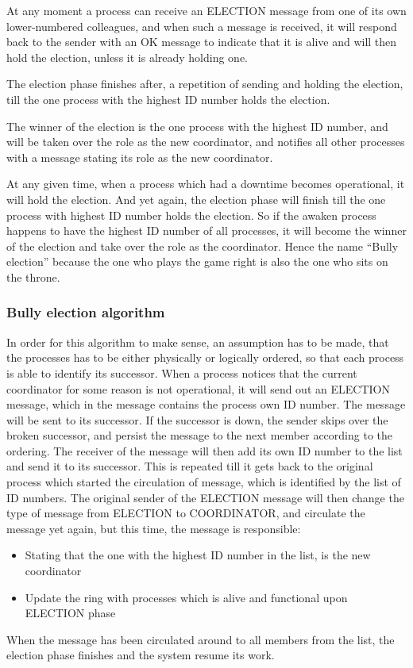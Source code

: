 At any moment a process can receive an ELECTION message from one of its own lower-numbered colleagues, and when such a message is received, it will respond back to the sender with an OK message to indicate that it is alive and will then hold the election, unless it is already holding one.

The election phase finishes after, a repetition of sending and holding the election, till the one process with the highest ID number holds the election.

The winner of the election is the one process with the highest ID number, and will be taken over the role as the new coordinator, and notifies all other processes with a message stating its role as the new coordinator. 

At any given time, when a process which had a downtime becomes operational, it will hold the election.
And yet again, the election phase will finish till the one process with highest ID number holds the election. So if the awaken process happens to have the highest ID number of all processes, it will become the winner of the election and take over the role as the coordinator. Hence the name “Bully election” because the one who plays the game right is also the one who sits on the throne.

\subsubsection{Bully election algorithm}
In order for this algorithm to make sense, an assumption has to be made, that the processes has to be either physically or logically ordered, so that each process is able to identify its successor.
When a process notices that the current coordinator for some reason is not operational, it will send out an ELECTION message, which in the message contains the process own ID number. The message will be sent to its successor. 
If the successor is down, the sender skips over the broken successor, and persist the message to the next member according to the ordering. The receiver of the message will then add its own ID number to the list and send it to its successor. This is repeated till it gets back to the original process which started the circulation of message, which is identified by the list of ID numbers.
The original sender of the ELECTION message will then change the type of message from ELECTION to COORDINATOR, and circulate the message yet again, but this time, the message is responsible:

\begin{itemize}
  \item Stating that the one with the highest ID number in the list, is the new coordinator
  \item Update the ring with processes which is alive and functional upon ELECTION phase
\end{itemize}

When the message has been circulated around to all members from the list, the election phase finishes and the system resume its work.
